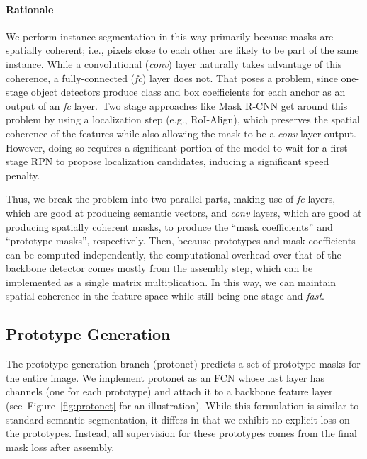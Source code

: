 \documentclass[10pt,journal,compsoc]{IEEEtran}
\begin{document}
\paragraph{Rationale}
We perform instance segmentation in this way primarily because masks are spatially coherent; i.e., pixels close to each other are likely to be part of the same instance. While a convolutional (\textit{conv}) layer naturally takes advantage of this coherence, a fully-connected (\textit{fc}) layer does not. That poses a problem, since one-stage object detectors produce class and box coefficients for each anchor as an output of an \textit{fc} layer.\footnotemark ~Two stage approaches like Mask R-CNN get around this problem by using a localization step (e.g., RoI-Align), which preserves the spatial coherence of the features while also allowing the mask to be a \textit{conv} layer output. However, doing so requires a significant portion of the model to wait for a first-stage RPN to propose localization candidates, inducing a significant speed penalty.


Thus, we break the problem into two parallel parts, making use of \textit{fc} layers, which are good at producing semantic vectors, and \textit{conv} layers, which are good at producing spatially coherent masks, to produce the ``mask coefficients'' and ``prototype masks'', respectively. Then, because prototypes and mask coefficients can be computed independently, the computational overhead over that of the backbone detector comes mostly from the assembly step, which can be implemented as a single matrix multiplication.  In this way, we can maintain spatial coherence in the feature space while still being one-stage and \emph{fast}.

\subsection{Prototype Generation}
The prototype generation branch (protonet) predicts a set of  prototype masks for the entire image. We implement protonet as an FCN whose last layer has  channels (one for each prototype) and attach it to a backbone feature layer (see~Figure~\ref{fig:protonet} for an illustration). While this formulation is similar to standard semantic segmentation, it differs in that we exhibit no explicit loss on the prototypes. Instead, all supervision for these prototypes comes from the final mask loss after assembly.
\end{document}
